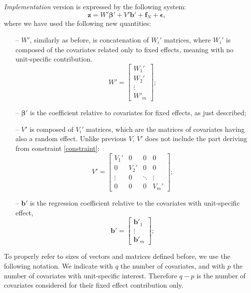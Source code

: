 \textit{Implementation} version is expressed by the following system:
\begin{equation}
	\bm{z}=W' \bm{\beta}' +V'\bm{b}' +\bm{f}_N + \bm{\epsilon},
\end{equation}
where we have used the following new quantities:
\begin{itemize}
	\item[--] $W'$, similarly as before, is concatenation of $W_i'$ matrices, where
		$W_i'$ is composed of the covariates related only to fixed effects, meaning
		with no unit-specific contribution.
		\begin{equation}
			W'=
			\begin{bmatrix*}
				W_1'\\
				W_2'\\
				\vdots\\
				W'_{m}
			\end{bmatrix*}
			;
		\end{equation}
	\item[--] $\bm{\beta}'$ is the coefficient relative to covariates for
		fixed effects, as just described; \item[--] $V'$ is composed of $V_i'$
		matrices, which are the matrices of covariates having also a random effect.
		Unlike previous $V$, $V'$ does not include the part deriving from constraint
		\ref{constraint}:
		\begin{equation}
			V'=
			\begin{bmatrix*}
				V_1' & 0 & 0 & 0\\
				0 & V_2' & 0 & 0\\
				\vdots & 0 & \ddots & \vdots\\
				0 & 0 & 0 & V_{m}'
			\end{bmatrix*}
			;
		\end{equation}
	\item[--] $\bm{b}'$ is the regression coefficient relative to the
		covariates with unit-specific effect,
		\begin{equation}
			\bm{b}'=
			\begin{bmatrix*}
				\bm{b}'_1\\
				\vdots\\
				\bm{b}'_{m}
			\end{bmatrix*}
			;
		\end{equation}
\end{itemize}
To properly refer to sizes of vectors and matrices defined before, we
use the following notation. We indicate with $q$ the number of covariates, and
with $p$ the number of covariates with unit-specific interest. Therefore $q-p$
is the number of covariates considered for their fixed effect contribution
only.

